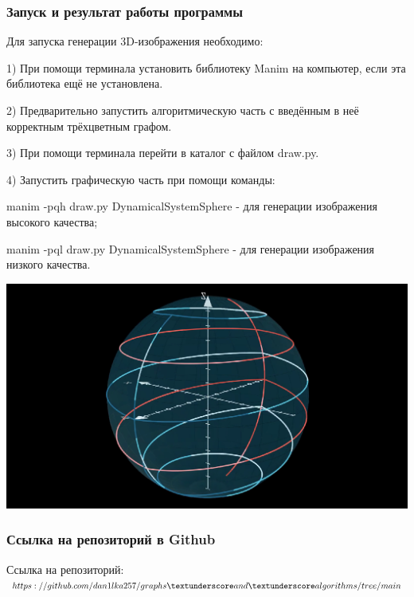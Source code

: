 \documentclass[aspectratio=169]{beamer}
\begin{document}
\begin{frame}
\frametitle{Запуск и результат работы программы}
	Для запуска генерации 3D-изображения необходимо:
	\par 1) При помощи терминала установить библиотеку Manim на компьютер, если эта библиотека ещё не установлена.
	\par 2) Предварительно запустить алгоритмическую часть с введённым в неё корректным трёхцветным графом.
	\par 3) При помощи терминала перейти в каталог с файлом draw.py.
	\par 4) Запустить графическую часть при помощи команды:
	\par manim -pqh draw.py DynamicalSystemSphere - для генерации изображения высокого качества;
	\par manim -pql draw.py DynamicalSystemSphere - для генерации изображения низкого качества.
\end{frame}
\begin{frame}
\includegraphics[width=\columnwidth]{Example}
\end{frame}
\begin{frame}
\frametitle{Ссылка на репозиторий в Github}
	Ссылка на репозиторий: $https://github.com/dan1lka257/graphs \textunderscore and \textunderscore algorithms/tree/main$
\end{frame}
\end{document}
